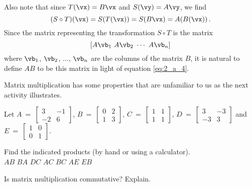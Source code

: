 Also note that since $T(\vx)=B\vx$ and $S(\vy)=A\vy$, we find 
\begin{equation} 
(S\circ T)(\vx)= S(T(\vx))= S(B\vx)=A(B(\vx)) \,.  \label{eq:2_a_4}
\end{equation}
Since the matrix representing the transformation $S\circ T$ is the matrix 
\[[A \vb_1 \ A\vb_2 \ \cdots \ A\vb_n]\]
where $\vb_1$, $\vb_2$, $\ldots$, $\vb_n$ are the columns of the matrix $B$, it is natural to define $AB$ to be this matrix in light of equation \eqref{eq:2_a_4}.



Matrix multiplication has some properties that are unfamiliar to us as the next activity illustrates.



\begin{activity} \label{act:A2.1_2} Let $A~=~\left[ \begin{array}{rr} 3 & -1 \\ -2 & 6 \end{array} \right]$, $B~=~\left[ \begin{array}{cc} 0 & 2 \\ 1 & 3  \end{array} \right]$, $C~=~\left[ \begin{array}{cc} 1 & 1 \\ 1 & 1 \end{array} \right]$, $D~=~\left[ \begin{array}{rr} 3 & -3 \\ -3 & 3 \end{array} \right]$ and $E~=~\left[ \begin{array}{cc} 1 & 0 \\ 0 & 1 \end{array} \right]$. 
	\ba
	\item Find the indicated products (by hand or using a calculator).\\
		$AB$ \hspace{0.75cm} $BA$ \hspace{0.75cm} $DC$ \hspace{0.75cm} $AC$ \hspace{0.75cm} $BC$ \hspace{0.75cm} $AE$ \hspace{0.75cm} $EB$

   

   
		
	\item Is matrix multiplication commutative? Explain.
	



\end{activity}
